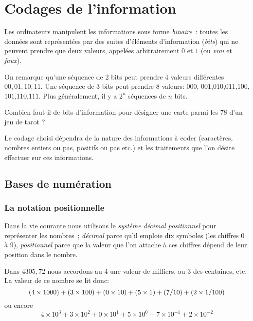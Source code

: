 \chapter{Codages de l'information}

Les ordinateurs manipulent les informations sous forme {\em binaire}~: 
toutes les donn\'ees sont repr\'esent\'ees par
des suites d'\'el\'ements d'information ({\em bits}) qui ne peuvent
prendre que deux valeurs, appel\'ees arbitrairement $0$ et $1$ 
(ou {\em vrai} et {\em faux}).


On remarque qu'une s\'equence de 2 bits peut prendre 4 valeurs diff\'erentes
$00, 01, 10, 11$. Une s\'equence de 3 bits peut prendre 8 valeurs: $000$,
$001$,$010$,$011$,$100$,$101$,$110$,$111$. Plus g\'en\'eralement,   il
 y a $2^n$ s\'equences de $n$ bits.

\begin{exercice}{} 
Combien faut-il de bits d'information pour d\'esigner une
carte parmi les 78 d'un jeu de tarot ?
\end{exercice}

Le codage choisi d\'ependra de
la nature des informations \`a coder (caract\`eres, nombres entiers ou pas, 
positifs ou pas etc.) et les traitements que l'on d\'esire effectuer sur
ces informations.

\section{Bases de num\'eration}

\subsection{La notation positionnelle}

Dans la vie courante nous utilisons le 
{\em syst\`eme d\'ecimal positionnel} 
pour repr\'esenter les nombres~; {\em d\'ecimal} 
parce qu'il emploie dix symboles
(les chiffres 0 \`a 9), {\em positionnel} parce que la valeur que 
l'on attache \`a 
ces chiffres d\'epend de leur position dans le nombre.  

\begin{exemple}{} Dans
$4305,72$ nous accordons au 4 une valeur de milliers, au 3 des centaines, etc.
La valeur de ce nombre se lit  donc:
$$(4 \times 1000) + (3 \times 100) + (0 \times 10) + (5 \times 1) + 
(7 \time 1/10) + (2 \times 1/100)$$
ou encore
$$4 \times 10^3 + 3 \times 10^2 + 0 \times 10^1 + 5 \times 10^0 + 
7 \times 10^{-1} + 2 \times 10^{-2}$$
\end{exemple}

